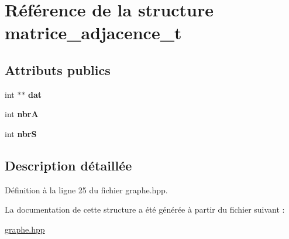 \hypertarget{structmatrice__adjacence__t}{\section{Référence de la structure matrice\+\_\+adjacence\+\_\+t}
\label{structmatrice__adjacence__t}
}
\subsection*{Attributs publics}
\begin{DoxyCompactItemize}
\item 
\hypertarget{structmatrice__adjacence__t_a22789ec00178354cf7d10af8afa4bd10}{int $\ast$$\ast$ {\bfseries dat}}\label{structmatrice__adjacence__t_a22789ec00178354cf7d10af8afa4bd10}

\item 
\hypertarget{structmatrice__adjacence__t_a27d3582be114699610adb4c332ce5448}{int {\bfseries nbr\+A}}\label{structmatrice__adjacence__t_a27d3582be114699610adb4c332ce5448}

\item 
\hypertarget{structmatrice__adjacence__t_a9d7874868df1751f3f65a5a852d7e0a5}{int {\bfseries nbr\+S}}\label{structmatrice__adjacence__t_a9d7874868df1751f3f65a5a852d7e0a5}

\end{DoxyCompactItemize}


\subsection{Description détaillée}


Définition à la ligne 25 du fichier graphe.\+hpp.



La documentation de cette structure a été générée à partir du fichier suivant \+:\begin{DoxyCompactItemize}
\item 
\hyperlink{graphe_8hpp}{graphe.\+hpp}\end{DoxyCompactItemize}
